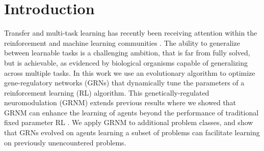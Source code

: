 \section{Introduction}

Transfer and multi-task learning has recently been receiving attention within the reinforcement and machine learning communities \cite{Li2009,Taylor2009}. The ability to generalize between learnable tasks is a challenging ambition, that is far from fully solved, but is achievable, as evidenced by biological organisms capable of generalizing across multiple tasks. In this work we use an evolutionary algorithm to optimize gene-regulatory networks (GRNs) that dynamically tune the parameters of a reinforcement learning (RL) algorithm. This genetically-regulated neuromodulation (GRNM) extends previous results where we showed that GRNM can enhance the learning of agents beyond the performance of traditional fixed parameter RL \cite{Harrington2013}. We apply GRNM to additional problem classes, and show that GRNs evolved on agents learning a subset of problems can facilitate learning on previously unencountered problems. 
